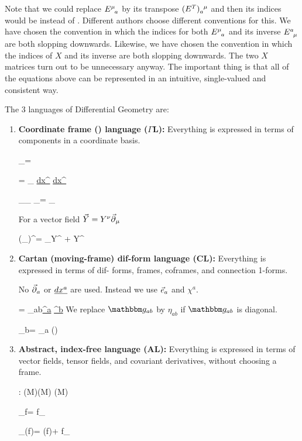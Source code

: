 Note that we could replace $E\indices{^\mu_a}$
by its transpose $(E^T)
\indices{_a^\mu}$
and then its indices would be  instead of 
.
Different authors choose
different conventions for this.
We have chosen the convention in which the
indices for both
$E\indices{^\mu_a}$
and its inverse $E\indices{^a_\mu}$
are both slopping downwards.
Likewise,
we have chosen the 
convention
in which the indices
of $X$ and its inverse are
both slopping downwards.
The two $X$ matrices turn
out to be unnecessary  anyway.
The important thing is that all of the equations above can be represented
in an intuitive,  single-valued and consistent way.

The 3 languages
of Differential Geometry
are:

\begin{enumerate}
\item
{\bf Coordinate frame (\Chris) language ($\Gamma$L):} Everything is expressed in terms of components in a coordinate basis.

\beq
\vecpartial_\mu =
\eeq

\beq
\metric =
\metric_{\mu\nu}
\ul{dx^\mu}\otimes
\ul{dx^\nu}
\eeq

\beq
\nnabla_{\vecpartial_\mu}
\vecpartial_\nu =
\Gamma\indices{^\rho_{\mu\nu}}
\vecpartial_\rho
\eeq

For a vector field
${\vec{Y}} = Y^\nu {\vec{\partial}}_\mu$


\beq
(\nnabla_\mu \vecY)^\rho=
\partial_\mu Y^\rho
+
\Gamma\indices{^\rho_{\mu\nu}}Y^\nu
\eeq

\item {\bf Cartan (moving-frame)
dif-form language (CL):} Everything is expressed in terms of dif- forms, frames, coframes, and connection 1-forms.

No ${\vec{\partial}}_a$ or $\ul{dx^a}$ are used. Instead we use ${\vec{e}}_a$ and $\chi^a$.

\beq
\metric=
\metric_{ab}\ul{\chi^a}
\otimes
\ul{\chi^b}
\eeq
We replace $\metric_{ab}$ by $\eta_{ab}$ if $\metric_{ab}$ is diagonal.

\beq
\nnabla \vece_b=
\vece_a
\ul{\omega{}}
(\vecX)
\eeq



\item {\bf Abstract, index-free language (AL):} Everything is expressed in terms of vector fields, tensor fields, and covariant derivatives, without choosing  a frame.

\beq
\nnabla: (M)\times{}(M)
\rarrow
{}(M)
\eeq

\beq
\nnabla_{f\vecX}\vecY=
f\nnabla_\vecX \vecY
\eeq

\beq
\nnabla_\vecX(f\vecY)=
\vecX(f)\vecY +
f\nnabla_\vecX \vecY
\eeq

\end{enumerate}

